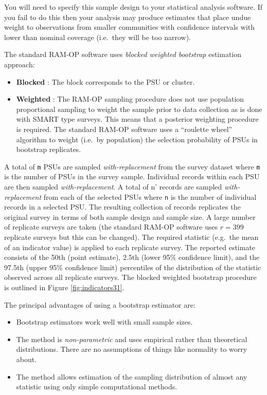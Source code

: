 \documentclass[12pt,a4paper]{book}
\providecommand{\tightlist}{%
  \setlength{\itemsep}{0pt}\setlength{\parskip}{0pt}}
\theoremstyle{definition}
\theoremstyle{definition}
\theoremstyle{definition}
\theoremstyle{remark}
\begin{document}
You will need to specify this sample design to your statistical analysis
software. If you fail to do this then your analysis may produce
estimates that place undue weight to observations from smaller
communities with confidence intervals with lower than nominal coverage
(i.e.~they will be too narrow).

The standard RAM-OP software uses \emph{blocked weighted bootstrap}
estimation approach:

\begin{itemize}
\tightlist
\item
  \textbf{Blocked} : The block corresponds to the PSU or cluster.
\item
  \textbf{Weighted} : The RAM-OP sampling procedure does not use
  population proportional sampling to weight the sample prior to data
  collection as is done with SMART type surveys. This means that a
  posterior weighting procedure is required. The standard RAM-OP
  software uses a ``roulette wheel'' algorithm to weight (i.e.~by
  population) the selection probability of PSUs in bootstrap replicates.
\end{itemize}

A total of \texttt{m\textquotesingle{}} PSUs are sampled
\emph{with-replacement} from the survey dataset where
\texttt{m\textquotesingle{}} is the number of PSUs in the survey sample.
Individual records within each PSU are then sampled
\emph{with-replacement}. A total of n' records are sampled
\emph{with-replacement} from each of the selected PSUs where
\texttt{n\textquotesingle{}} is the number of individual records in a
selected PSU. The resulting collection of records replicates the
original survey in terms of both sample design and sample size. A large
number of replicate surveys are taken (the standard RAM-OP software uses
\(r = 399\) replicate surveys but this can be changed). The required
statistic (e.g.~the mean of an indicator value) is applied to each
replicate survey. The reported estimate consists of the 50th (point
estimate), 2.5th (lower 95\% confidence limit), and the 97.5th (upper
95\% confidence limit) percentiles of the distribution of the statistic
observed across all replicate surveys. The blocked weighted bootstrap
procedure is outlined in Figure \ref{fig:indicators31}.

The principal advantages of using a bootstrap estimator are:

\begin{itemize}
\tightlist
\item
  Bootstrap estimators work well with small sample sizes.
\item
  The method is \emph{non-parametric} and uses empirical rather than
  theoretical distributions. There are no assumptions of things like
  normality to worry about.
\item
  The method allows estimation of the sampling distribution of almost
  any statistic using only simple computational methods.
\end{itemize}
\end{document}
